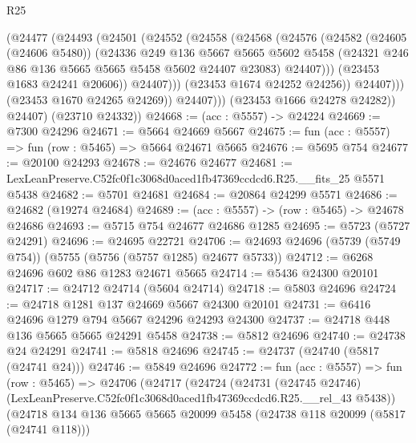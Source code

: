 \begin{lexlean}{R25}
\begin{coremodule}
                      (@24477
                        (@24493
                          (@24501
                            (@24552
                              (@24558
                                (@24568
                                  (@24576
                                    (@24582
                                      (@24605 (@24606 @5480))
                                      (@24336
                                        @249
                                        @136
                                        @5667
                                        @5665
                                        @5602
                                        @5458
                                        (@24321 @246 @86 @136 @5665 @5665 @5458 @5602 @24407 @23083)
                                        @24407)))
                                  (@23453 @1683 @24241 @20606))
                                @24407)))
                          (@23453 @1674 @24252 @24256))
                        @24407)))
                  (@23453 @1670 @24265 @24269))
                @24407)))
          (@23453 @1666 @24278 @24282))
        @24407)
      (@23710 @24332))
@24668 := (acc : @5557) -> @24224
@24669 := @7300 @24296
@24671 := @5664 @24669 @5667
@24675 := fun (acc : @5557) => fun (row : @5465) => @5664 @24671 @5665
@24676 := @5695 @754
@24677 := @20100 @24293
@24678 := @24676 @24677
@24681 := LexLeanPreserve.C52fc0f1c3068d0aced1fb47369ccdcd6.R25.__fits_25 @5571 @5438
@24682 := @5701 @24681
@24684 := @20864 @24299 @5571
@24686 := @24682 (@19274 @24684)
@24689 := (acc : @5557) -> (row : @5465) -> @24678 @24686
@24693 := @5715 @754 @24677 @24686 @1285
@24695 := @5723 (@5727 @24291)
@24696 := @24695 @22721
@24706 := @24693 @24696 (@5739 (@5749 @754)) (@5755 (@5756 (@5757 @1285) @24677 @5733))
@24712 := @6268 @24696 @602 @86 @1283 @24671 @5665
@24714 := @5436 @24300 @20101
@24717 := @24712 @24714 (@5604 @24714)
@24718 := @5803 @24696
@24724 := @24718 @1281 @137 @24669 @5667 @24300 @20101
@24731 := @6416 @24696 @1279 @794 @5667 @24296 @24293 @24300
@24737 := @24718 @448 @136 @5665 @5665 @24291 @5458
@24738 := @5812 @24696
@24740 := @24738 @24 @24291
@24741 := @5818 @24696
@24745 := @24737 (@24740 (@5817 (@24741 @24)))
@24746 := @5849 @24696
@24772 := fun (acc : @5557) =>
  fun (row : @5465) =>
  @24706
    (@24717
      (@24724
        (@24731
          (@24745 @24746)
          (LexLeanPreserve.C52fc0f1c3068d0aced1fb47369ccdcd6.R25.__rel_43 @5438))
        (@24718
          @134
          @136
          @5665
          @5665
          @20099
          @5458
          (@24738 @118 @20099 (@5817 (@24741 @118)))

\end{coremodule}
\end{lexlean}
